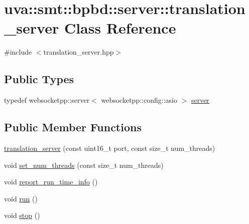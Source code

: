 \hypertarget{classuva_1_1smt_1_1bpbd_1_1server_1_1translation__server}{}\section{uva\+:\+:smt\+:\+:bpbd\+:\+:server\+:\+:translation\+\_\+server Class Reference}
\label{classuva_1_1smt_1_1bpbd_1_1server_1_1translation__server}


{\ttfamily \#include $<$translation\+\_\+server.\+hpp$>$}

\subsection*{Public Types}
\begin{DoxyCompactItemize}
\item 
typedef websocketpp\+::server$<$ websocketpp\+::config\+::asio $>$ \hyperlink{classuva_1_1smt_1_1bpbd_1_1server_1_1translation__server_a7a3d55d39330bc8414d5c0964c8e5bd7}{server}
\end{DoxyCompactItemize}
\subsection*{Public Member Functions}
\begin{DoxyCompactItemize}
\item 
\hyperlink{classuva_1_1smt_1_1bpbd_1_1server_1_1translation__server_a3f8206303fa38e30dbd84fa8801e2e2e}{translation\+\_\+server} (const uint16\+\_\+t port, const size\+\_\+t num\+\_\+threads)
\item 
void \hyperlink{classuva_1_1smt_1_1bpbd_1_1server_1_1translation__server_a777df696ef2e9bb24fe19b4bff7b7e81}{set\+\_\+num\+\_\+threads} (const size\+\_\+t num\+\_\+threads)
\item 
void \hyperlink{classuva_1_1smt_1_1bpbd_1_1server_1_1translation__server_a0c987a4eb353484a89f6b54c44e4940b}{report\+\_\+run\+\_\+time\+\_\+info} ()
\item 
void \hyperlink{classuva_1_1smt_1_1bpbd_1_1server_1_1translation__server_a16dcf58e027baa12eec503b2323a8131}{run} ()
\item 
void \hyperlink{classuva_1_1smt_1_1bpbd_1_1server_1_1translation__server_a49a359715e8314937625e44c85d79c25}{stop} ()
\end{DoxyCompactItemize}
